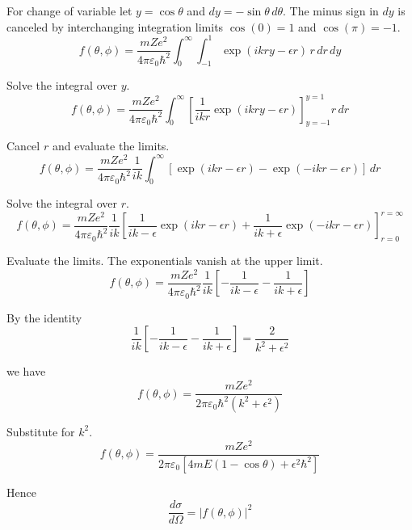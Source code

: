 For change of variable let $y=\cos\theta$ and $dy=-\sin\theta\,d\theta$.
The minus sign in $dy$ is canceled by interchanging integration limits
$\cos(0)=1$ and $\cos(\pi)=-1$.
\begin{equation*}
f(\theta,\phi)
=\frac{mZe^2}{4\pi\varepsilon_0\hbar^2}
\int_0^\infty
\int_{-1}^1
\exp(ikry-\epsilon r)
\,r\,dr\,dy
\end{equation*}

Solve the integral over $y$.
\begin{equation*}
f(\theta,\phi)=\frac{mZe^2}{4\pi\varepsilon_0\hbar^2}
\int_0^\infty
\left[\frac{1}{ikr}\exp(ikry-\epsilon r)\right]_{y=-1}^{y=1}
r\,dr
\end{equation*}

Cancel $r$ and evaluate the limits.
\begin{equation*}
f(\theta,\phi)=\frac{mZe^2}{4\pi\varepsilon_0\hbar^2}\frac{1}{ik}
\int_0^\infty
[\exp(ikr-\epsilon r)-\exp(-ikr-\epsilon r)]
\,dr
\end{equation*}

Solve the integral over $r$.
\begin{equation*}
f(\theta,\phi)=\frac{mZe^2}{4\pi\varepsilon_0\hbar^2}
\frac{1}{ik}
\left[
\frac{1}{ik-\epsilon}
\exp(ikr-\epsilon r)
+\frac{1}{ik+\epsilon}
\exp(-ikr-\epsilon r)
\right]_{r=0}^{r=\infty}
\end{equation*}

Evaluate the limits. The exponentials vanish at the upper limit.
\begin{equation*}
f(\theta,\phi)=\frac{mZe^2}{4\pi\varepsilon_0\hbar^2}
\frac{1}{ik}
\left[
-\frac{1}{ik-\epsilon}
-\frac{1}{ik+\epsilon}
\right]
\end{equation*}

By the identity
\begin{equation*}
\frac{1}{ik}
\left[
-\frac{1}{ik-\epsilon}
-\frac{1}{ik+\epsilon}
\right]
=\frac{2}{k^2+\epsilon^2}
\tag{1}
\end{equation*}

we have
\begin{equation*}
f(\theta,\phi)=\frac{mZe^2}{2\pi\varepsilon_0\hbar^2(k^2+\epsilon^2)}
\tag{2}
\end{equation*}

Substitute for $k^2$.
\begin{equation*}
f(\theta,\phi)=\frac{mZe^2}{2\pi\varepsilon_0[4mE(1-\cos\theta)+\epsilon^2\hbar^2]}
\end{equation*}

Hence
\begin{equation*}
\frac{d\sigma}{d\Omega}
=|f(\theta,\phi)|^2
\end{equation*}

